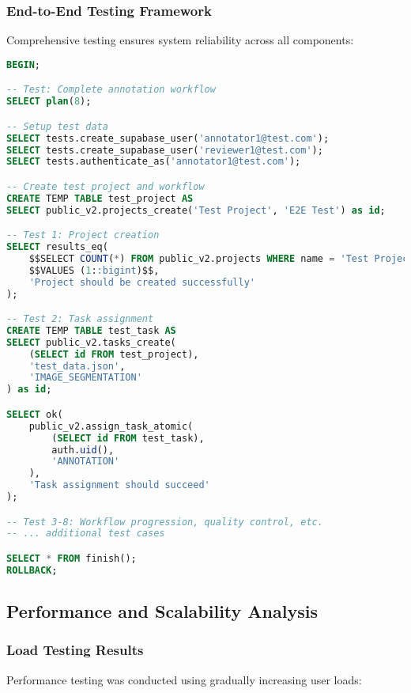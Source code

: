 \subsubsection{End-to-End Testing Framework}

Comprehensive testing ensures system reliability across all components:

\begin{lstlisting}[language=sql, caption=Example End-to-End Test]
BEGIN;

-- Test: Complete annotation workflow
SELECT plan(8);

-- Setup test data
SELECT tests.create_supabase_user('annotator1@test.com');
SELECT tests.create_supabase_user('reviewer1@test.com');
SELECT tests.authenticate_as('annotator1@test.com');

-- Create test project and workflow
CREATE TEMP TABLE test_project AS
SELECT public_v2.projects_create('Test Project', 'E2E Test') as id;

-- Test 1: Project creation
SELECT results_eq(
    $$SELECT COUNT(*) FROM public_v2.projects WHERE name = 'Test Project'$$,
    $$VALUES (1::bigint)$$,
    'Project should be created successfully'
);

-- Test 2: Task assignment
CREATE TEMP TABLE test_task AS
SELECT public_v2.tasks_create(
    (SELECT id FROM test_project), 
    'test_data.json', 
    'IMAGE_SEGMENTATION'
) as id;

SELECT ok(
    public_v2.assign_task_atomic(
        (SELECT id FROM test_task),
        auth.uid(),
        'ANNOTATION'
    ),
    'Task assignment should succeed'
);

-- Test 3-8: Workflow progression, quality control, etc.
-- ... additional test cases

SELECT * FROM finish();
ROLLBACK;
\end{lstlisting}

\subsection{Performance and Scalability Analysis}

\subsubsection{Load Testing Results}

Performance testing was conducted using gradually increasing user loads:

